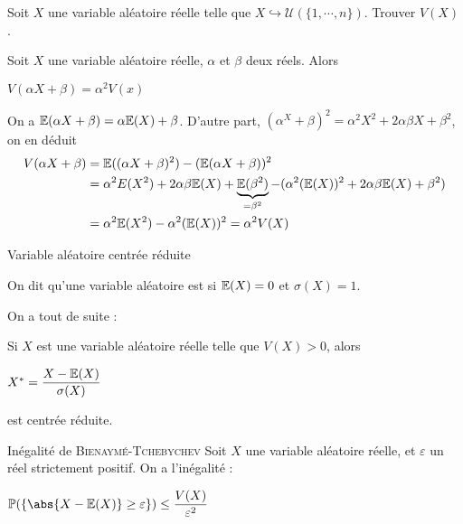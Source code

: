 \documentclass[12pt,a4paper]{report}
\begin{document}
\begin{exemple}[Exercice 16]{}
Soit $X$ une variable aléatoire réelle telle que $X \hookrightarrow \mathcal{U}(\{1,\cdots,n\})$. Trouver $V(X)$.
\end{exemple}

\begin{proposition}{}{}
Soit $X$ une variable aléatoire réelle, $\alpha$ et $\beta$ deux réels. Alors 
\begin{center}
$V(\alpha X + \beta) = \alpha^2 V(x)$
\end{center}
\end{proposition}

\begin{demo}{}
On a $\mathbb{E}(\alpha X + \beta) = \alpha \mathbb{E}(X) + \beta$. D'autre part, $(\alpha^X + \beta)^2 = \alpha^2 X^2 + 2\alpha \beta X + \beta^2$, on en déduit
\begin{align*}
V(\alpha X + \beta) &= \mathbb{E}((\alpha X + \beta)^2) - (\mathbb{E}(\alpha X + \beta))^2 \\
&= \alpha^2 E(X^2) + 2\alpha \beta \mathbb{E}(X) + \underbrace{\mathbb{E}(\beta^2)}_{=\beta^2} - (\alpha^2(\mathbb{E}(X))^2 + 2\alpha \beta \mathbb{E}(X) + \beta^2) \\
&= \alpha^2 \mathbb{E}(X^2) -\alpha^2 (\mathbb{E}(X))^2 = \alpha^2 V(X)
\end{align*}
\end{demo}

\begin{definition}{Variable aléatoire centrée réduite}{}

On dit qu'une variable aléatoire est  si $\mathbb{E}(X) = 0$ et $\sigma(X) = 1$.
\end{definition}

On a tout de suite : 

\begin{proposition}{}{}
Si $X$ est une variable aléatoire réelle telle que $V(X) > 0$, alors 
\begin{center}
$X^* = \dfrac{X-\mathbb{E}(X)}{\sigma(X)}$
\end{center}
est centrée réduite.
\end{proposition}

\begin{theoreme}{Inégalité de \textsc{Bienaymé-Tchebychev}}{}
Soit $X$ une variable aléatoire réelle, et $\varepsilon$ un réel strictement positif. On a l'inégalité : 
\begin{center}
$\p(\{\abs{X-\E(X)} \ge \varepsilon\}) \le \dfrac{V(X)}{\varepsilon^2}$
\end{center}
\end{theoreme}
\end{document}

